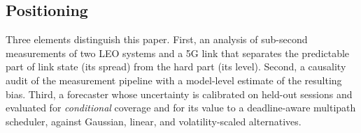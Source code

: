 \subsection{Positioning}
Three elements distinguish this paper. First, an analysis of sub-second measurements of two LEO systems and a 5G link that separates the predictable part of link state (its spread) from the hard part (its level). Second, a causality audit of the measurement pipeline with a model-level estimate of the resulting bias. Third, a forecaster whose uncertainty is calibrated on held-out sessions and evaluated for \emph{conditional} coverage and for its value to a deadline-aware multipath scheduler, against Gaussian, linear, and volatility-scaled alternatives.
